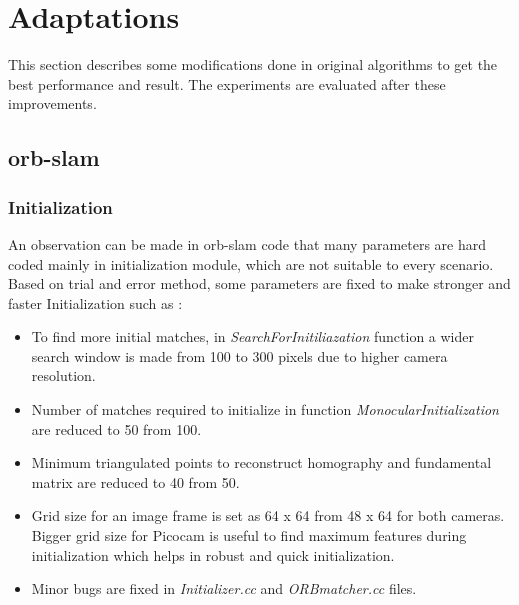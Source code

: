 \section{Adaptations}
This section describes some modifications done in original algorithms to get the best performance and result. The experiments are evaluated after these improvements. 

\subsection{\acrshort{orb}-\acrshort{slam}}

\subsubsection{Initialization}
An observation can be made in \acrshort{orb}-\acrshort{slam} code that many parameters are hard coded mainly in initialization module, which are not suitable to every scenario. Based on trial and error method, some parameters are fixed to make stronger and faster Initialization such as :
\begin{itemize} 
   	\item To find more initial matches, in \textit{SearchForInitiliazation} function  a wider search window is made from 100 to 300 pixels due to higher camera resolution.
	\item Number of matches required to initialize in function \textit{MonocularInitialization} are reduced to 50 from 100.
 	\item Minimum triangulated points to reconstruct homography and fundamental matrix are reduced to 40 from 50. 
 	\item Grid size for an image frame is set as 64 x 64 from 48 x 64 for both cameras. Bigger grid size for Picocam is useful to find maximum features during initialization which helps in robust and quick initialization. 
	\item Minor bugs are fixed in \textit{Initializer.cc} and \textit{ORBmatcher.cc} files.
\end{itemize}

